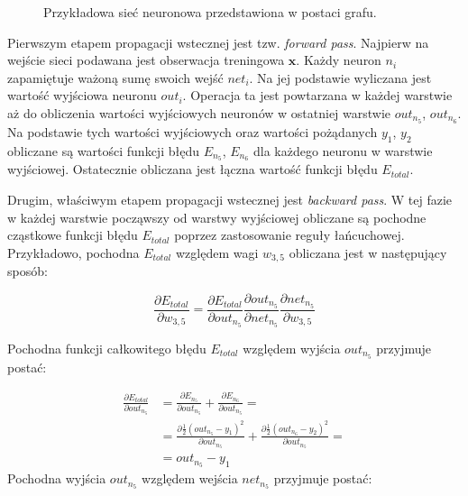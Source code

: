 \documentclass[notitlepage]{report}
\begin{document}
\begin{figure}[H]
	\centering
	\caption{Przykładowa sieć neuronowa przedstawiona w postaci grafu.}
\end{figure}

Pierwszym etapem propagacji wstecznej jest tzw. \textit{forward pass}. Najpierw na wejście sieci podawana jest obserwacja treningowa $\mathbf{x}$. Każdy neuron $n_i$ zapamiętuje ważoną sumę swoich wejść $net_i$. Na jej podstawie wyliczana jest wartość wyjściowa neuronu $out_i$. Operacja ta jest powtarzana w każdej warstwie aż do obliczenia wartości wyjściowych neuronów w ostatniej warstwie $out_{n_5}$, $out_{n_6}$. Na podstawie tych wartości wyjściowych oraz wartości pożądanych $y_1$, $y_2$ obliczane są wartości funkcji błędu $E_{n_5}$, $E_{n_6}$ dla każdego neuronu w warstwie wyjściowej. Ostatecznie obliczana jest łączna wartość funkcji błędu $E_{total}$.

Drugim, właściwym etapem propagacji wstecznej jest \textit{backward pass}. W tej fazie w każdej warstwie począwszy od warstwy wyjściowej obliczane są pochodne cząstkowe funkcji błędu $E_{total}$ poprzez zastosowanie reguły łańcuchowej. Przykładowo, pochodna $E_{total}$ względem wagi $w_{3,5}$ obliczana jest w następujący sposób:

\begin{equation}
\frac{\partial E_{total}}{\partial w_{3,5}} = \frac{\partial E_{total}}{\partial out_{n_5}}\frac{\partial out_{n_5}}{\partial net_{n_5}}\frac{\partial net_{n_5}}{\partial w_{3,5}}
\end{equation}

Pochodna funkcji całkowitego błędu $E_{total}$ względem wyjścia $out_{n_5}$ przyjmuje postać:

\begin{equation}
\begin{split}
\frac{\partial E_{total}}{\partial out_{n_5}} & = \frac{\partial E_{n_5}}{\partial out_{n_5}} + \frac{\partial E_{n_6}}{\partial out_{n_5}} = \\ & = \frac{\partial \frac{1}{2}(out_{n_5} - y_1)^2}{\partial out_{n_5}} + \frac{\partial \frac{1}{2}(out_{n_6} - y_2)^2}{\partial out_{n_5}} = \\ & = out_{n_5} - y_1
\end{split}
\end{equation}
Pochodna wyjścia $out_{n_5}$ względem wejścia $net_{n_5}$ przyjmuje postać:
\end{document}
